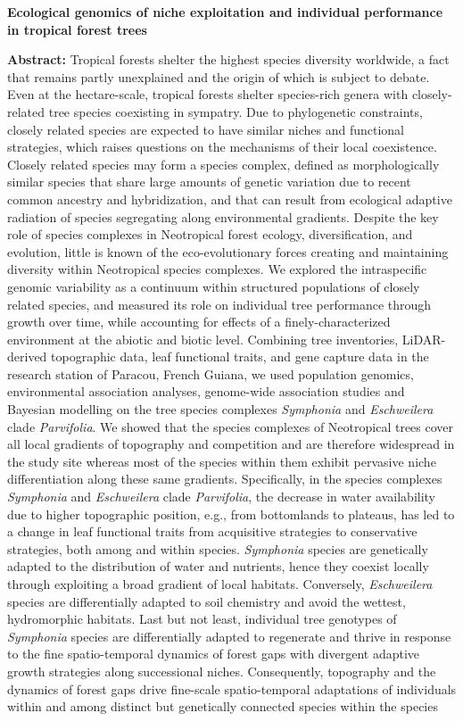 \documentclass[12pt,twoside,a4paper, a]{article}
\begin{document}
{  \begin{center}
  \textbf{Ecological genomics of niche exploitation and individual performance in tropical forest trees} \\
  \end{center} 
  \textbf{Abstract:}
  Tropical forests shelter the highest species diversity worldwide, a fact that remains partly unexplained and the origin of which is subject to debate. Even at the hectare-scale, tropical forests shelter species-rich genera with closely-related tree species coexisting in sympatry. Due to phylogenetic constraints, closely related species are expected to have similar niches and functional strategies, which raises questions on the mechanisms of their local coexistence. Closely related species may form a species complex, defined as morphologically similar species that share large amounts of genetic variation due to recent common ancestry and hybridization, and that can result from ecological adaptive radiation of species segregating along environmental gradients. Despite the key role of species complexes in Neotropical forest ecology, diversification, and evolution, little is known of the eco-evolutionary forces creating and maintaining diversity within Neotropical species complexes. We explored the intraspecific genomic variability as a continuum within structured populations of closely related species, and measured its role on individual tree performance through growth over time, while accounting for effects of a finely-characterized environment at the abiotic and biotic level. Combining tree inventories, LiDAR-derived topographic data, leaf functional traits, and gene capture data in the research station of Paracou, French Guiana, we used population genomics, environmental association analyses, genome-wide association studies and Bayesian modelling on the tree species complexes \emph{Symphonia} and \emph{Eschweilera} clade \emph{Parvifolia}. We showed that the species complexes of Neotropical trees cover all local gradients of topography and competition and are therefore widespread in the study site whereas most of the species within them exhibit pervasive niche differentiation along these same gradients. Specifically, in the species complexes \emph{Symphonia} and \emph{Eschweilera} clade \emph{Parvifolia}, the decrease in water availability due to higher topographic position, e.g., from bottomlands to plateaus, has led to a change in leaf functional traits from acquisitive strategies to conservative strategies, both among and within species. \emph{Symphonia} species are genetically adapted to the distribution of water and nutrients, hence they coexist locally through exploiting a broad gradient of local habitats. Conversely, \emph{Eschweilera} species are differentially adapted to soil chemistry and avoid the wettest, hydromorphic habitats. Last but not least, individual tree genotypes of \emph{Symphonia} species are differentially adapted to regenerate and thrive in response to the fine spatio-temporal dynamics of forest gaps with divergent adaptive growth strategies along successional niches. Consequently, topography and the dynamics of forest gaps drive fine-scale spatio-temporal adaptations of individuals within and among distinct but genetically connected species within the species }
\end{document}
